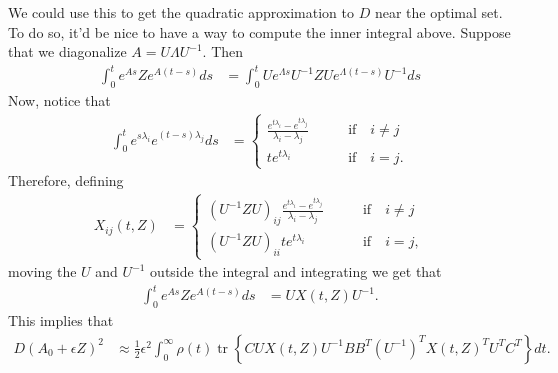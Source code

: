 \documentclass{article}
\newcommand{\tr}{\mathop{\mbox{tr}}} %
\newcommand{\1}{\mathbbm{1}}
\begin{document}
We could use this to get the quadratic approximation to $D$ near the optimal set.
To do so, it'd be nice to have a way to compute the inner integral above.
Suppose that we diagonalize $A = U \Lambda U^{-1}$.
Then
\begin{equation} \label{eqn:exp_deriv}
  \begin{aligned}
      \int_0^t e^{As} Z e^{A(t-s)} ds 
      &=
      \int_0^t U e^{\Lambda s} U^{-1} Z U e^{\Lambda (t-s)} U^{-1} ds 
  \end{aligned}
\end{equation}
Now, notice that
\begin{equation}
  \begin{aligned}
      \int_0^t e^{s \lambda_i} e^{(t-s) \lambda_j} ds
      &= \begin{cases}
      \frac{ e^{t \lambda_i} - e^{t \lambda_j} }{ \lambda_i - \lambda_j } 
          \qquad & \text{if} \quad i \neq j \\
          t e^{t \lambda_i} 
          \qquad & \text{if} \quad i = j .
      \end{cases}
  \end{aligned}
\end{equation}
Therefore, 
defining
\begin{equation}
    \begin{aligned}
    X_{ij}(t,Z) 
        &= \begin{cases}
        \left( U^{-1} Z U \right)_{ij}
      \frac{ e^{t \lambda_i} - e^{t \lambda_j} }{ \lambda_i - \lambda_j } 
          \qquad & \text{if} \quad i \neq j \\
      \left( U^{-1} Z U \right)_{ii}
          t e^{t \lambda_i} 
          \qquad & \text{if} \quad i = j ,
        \end{cases}
    \end{aligned}
\end{equation}
moving the $U$ and $U^{-1}$ outside the integral and integrating we get that
\begin{equation}
  \begin{aligned}
      \int_0^t e^{As} Z e^{A(t-s)} ds 
      &=
      U X(t,Z) U^{-1} .
  \end{aligned}
\end{equation}
This implies that
\begin{equation}
    \begin{aligned}
        D(A_0+\epsilon Z)^2
        &\approx \frac{1}{2} \epsilon^2 
        \int_0^\infty
            \rho(t) \tr\left\{ C U X(t,Z) U^{-1} B B^T (U^{-1})^T X(t,Z)^T U^T C^T \right\}
        dt .
    \end{aligned}
\end{equation}
\end{document}
